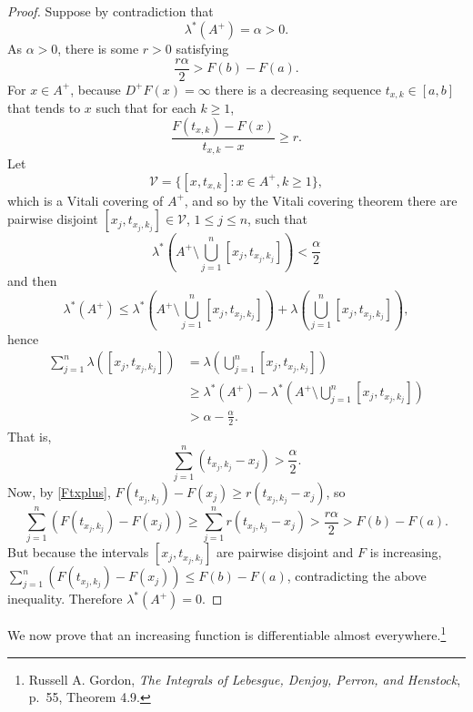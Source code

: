 \documentclass{article}
\theoremstyle{definition}
\theoremstyle{definition}
\begin{document}
\begin{proof}
Suppose by contradiction that
\[
\lambda^*(A^+)=\alpha>0.
\]
As $\alpha>0$, there is some
$r>0$ satisfying
\[
\frac{r\alpha}{2}>F(b)-F(a).
\]
For $x \in A^+$, because $D^+F(x)=\infty$ there is a decreasing sequence
$t_{x,k} \in [a,b]$ that tends to $x$ such that for each $k \geq 1$,
\begin{equation}
\frac{F(t_{x,k})-F(x)}{t_{x,k}-x} \geq r.
\label{Ftxplus}
\end{equation}
Let
\[
\mathcal{V} = \{[x,t_{x,k}]: x \in A^+, k \geq 1\},
\]
which is a Vitali covering of $A^+$, and so by the Vitali covering theorem there are
pairwise disjoint $[x_j,t_{x_j,k_j}] \in  \mathcal{V}$, $1 \leq j \leq n$, such that 
\[
\lambda^*\left(A^+ \setminus \bigcup_{j=1}^n [x_j,t_{x_j,k_j}]\right) < \frac{\alpha}{2}
\]
and then
\[
\lambda^*(A^+) \leq \lambda^*\left(A^+ \setminus \bigcup_{j=1}^n [x_j,t_{x_j,k_j}]\right)
+\lambda\left( \bigcup_{j=1}^n [x_j,t_{x_j,k_j}]\right),
\]
hence
\begin{align*}
\sum_{j=1}^n \lambda( [x_j,t_{x_j,k_j}])&=\lambda\left( \bigcup_{j=1}^n [x_j,t_{x_j,k_j}]\right)\\
&\geq  \lambda^*(A^+)  -  \lambda^*\left(A^+ \setminus \bigcup_{j=1}^n [x_j,t_{x_j,k_j}]\right)\\
&>\alpha - \frac{\alpha}{2}.
\end{align*}
That is,
\[
\sum_{j=1}^n (t_{x_j,k_j} - x_j) > \frac{\alpha}{2}.
\]
Now, by \eqref{Ftxplus}, $F(t_{x_j,k_j})-F(x_j) \geq r(t_{x_j,k_j}-x_j)$, so
\[
\sum_{j=1}^n (F(t_{x_j,k_j})-F(x_j)) \geq
\sum_{j=1}^n r(t_{x_j,k_j} - x_j) > \frac{r\alpha}{2}>F(b)-F(a).
\]
But because the intervals $[x_j,t_{x_j,k_j}]$ are pairwise disjoint and $F$ is increasing,
$\sum_{j=1}^n (F(t_{x_j,k_j})-F(x_j)) \leq F(b)-F(a)$, contradicting the above inequality.
Therefore $\lambda^*(A^+)=0$. 
\end{proof}




We now prove that an increasing function is differentiable almost everywhere.\footnote{Russell A. Gordon, {\em The Integrals of Lebesgue, Denjoy, Perron, and Henstock}, p.~55, Theorem 4.9.}
\end{document}
